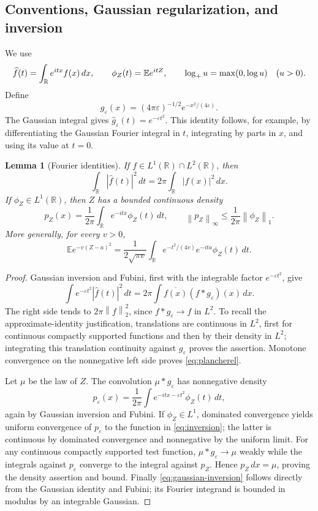 \documentclass[11pt]{article}
\numberwithin{equation}{section}
\newtheorem{lemma}[theorem]{Lemma}
\theoremstyle{definition}\newtheorem{definition}[theorem]{Definition}
\theoremstyle{remark}\newtheorem{remark}[theorem]{Remark}
\newcommand{\R}{\mathbb R}\newcommand{\E}{\mathbb E}\newcommand{\PP}{\mathbb P}
\newcommand{\1}{\mathbf 1}\newcommand{\diag}{\operatorname{diag}}
\newcommand{\norm}[1]{\left\lVert#1\right\rVert}\newcommand{\abs}[1]{\left|#1\right|}
\begin{document}
\subsection{Conventions, Gaussian regularization, and inversion}
We use
\[
 \widehat f(t)=\int_\R e^{itx}f(x)\,dx,\qquad
 \phi_Z(t)=\E e^{itZ},\qquad
 \logp u=\max(0,\log u)\quad(u>0).
\]
Define
\[
 g_\varepsilon(x)=(4\pi\varepsilon)^{-1/2}e^{-x^2/(4\varepsilon)}.
\]
The Gaussian integral gives $\widehat g_\varepsilon(t)=e^{-\varepsilon t^2}$. This identity follows, for example, by differentiating the Gaussian Fourier integral in $t$, integrating by parts in $x$, and using its value at $t=0$.

\begin{lemma}[Fourier identities]\label{lem:fourier}
If $f\in L^1(\R)\cap L^2(\R)$, then
\begin{equation}\label{eq:plancherel}
 \int_\R|\widehat f(t)|^2\,dt=2\pi\int_\R|f(x)|^2\,dx.
\end{equation}
If $\phi_Z\in L^1(\R)$, then $Z$ has a bounded continuous density
\begin{equation}\label{eq:inversion}
 p_Z(x)=\frac1{2\pi}\int_\R e^{-itx}\phi_Z(t)\,dt,
 \qquad \norm{p_Z}_\infty\le\frac1{2\pi}\norm{\phi_Z}_1.
\end{equation}
More generally, for every $v>0$,
\begin{equation}\label{eq:gaussian-inversion}
 \E e^{-v(Z-a)^2}
 =\frac1{2\sqrt{\pi v}}\int_\R e^{-t^2/(4v)}e^{-ita}\phi_Z(t)\,dt.
\end{equation}
\end{lemma}
\begin{proof}
Gaussian inversion and Fubini, first with the integrable factor $e^{-\varepsilon t^2}$, give
\[
 \int e^{-\varepsilon t^2}|\widehat f(t)|^2\,dt
 =2\pi\int \overline{f(x)}(f*g_\varepsilon)(x)\,dx.
\]
The right side tends to $2\pi\norm f_2^2$, since $f*g_\varepsilon\to f$ in $L^2$. To recall the approximate-identity justification, translations are continuous in $L^2$, first for continuous compactly supported functions and then by their density in $L^2$; integrating this translation continuity against $g_\varepsilon$ proves the assertion. Monotone convergence on the nonnegative left side proves \eqref{eq:plancherel}.

Let $\mu$ be the law of $Z$. The convolution $\mu*g_\varepsilon$ has nonnegative density
\[
 p_\varepsilon(x)=\frac1{2\pi}\int e^{-itx-\varepsilon t^2}\phi_Z(t)\,dt,
\]
again by Gaussian inversion and Fubini. If $\phi_Z\in L^1$, dominated convergence yields uniform convergence of $p_\varepsilon$ to the function in \eqref{eq:inversion}; the latter is continuous by dominated convergence and nonnegative by the uniform limit. For any continuous compactly supported test function, $\mu*g_\varepsilon\to\mu$ weakly while the integrals against $p_\varepsilon$ converge to the integral against $p_Z$. Hence $p_Z\,dx=\mu$, proving the density assertion and bound. Finally \eqref{eq:gaussian-inversion} follows directly from the Gaussian identity and Fubini; its Fourier integrand is bounded in modulus by an integrable Gaussian.
\end{proof}
\end{document}
